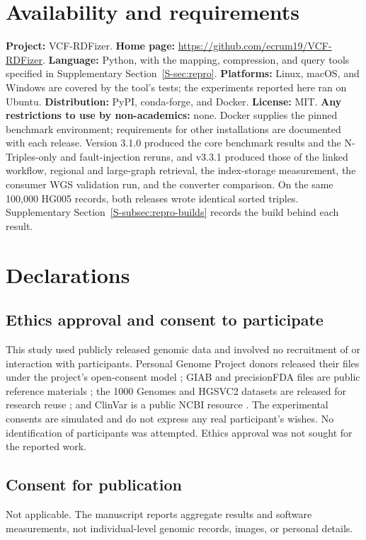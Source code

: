\documentclass[pdflatex,sn-mathphys-num]{sn-jnl}
\begin{document}
\section*{Availability and requirements}
\textbf{Project:} VCF-RDFizer.
\textbf{Home page:} \url{https://github.com/ecrum19/VCF-RDFizer}.
\textbf{Language:} Python, with the mapping, compression, and query tools specified in Supplementary Section~\ref{S-sec:repro}.
\textbf{Platforms:} Linux, macOS, and Windows are covered by the tool's tests; the experiments reported here ran on Ubuntu.
\textbf{Distribution:} PyPI, conda-forge, and Docker.
\textbf{License:} MIT.
\textbf{Any restrictions to use by non-academics:} none.
Docker supplies the pinned benchmark environment; requirements for other installations are documented with each release.
Version 3.1.0 produced the core benchmark results and the N-Triples-only and fault-injection reruns, and v3.3.1 produced those of the linked workflow, regional and large-graph retrieval, the index-storage measurement, the consumer WGS validation run, and the converter comparison.
On the same 100,000 HG005 records, both releases wrote identical sorted triples.
Supplementary Section~\ref{S-subsec:repro-builds} records the build behind each result.

\section*{Declarations}
\subsection*{Ethics approval and consent to participate}
This study used publicly released genomic data and involved no recruitment of or interaction with participants.
Personal Genome Project donors released their files under the project's open-consent model \cite{personal_genome_proj}; GIAB and precisionFDA files are public reference materials \cite{nist_gib_2025,giab_v421_2022}; the 1000 Genomes and HGSVC2 datasets are released for research reuse \cite{thousand_genomes_2015,byrska2022highcoverage,hgsvc_2021}; and ClinVar is a public NCBI resource \cite{clinvar_vcf}.
The experimental consents are simulated and do not express any real participant's wishes.
No identification of participants was attempted.
Ethics approval was not sought for the reported work.

\subsection*{Consent for publication}
Not applicable.
The manuscript reports aggregate results and software measurements, not individual-level genomic records, images, or personal details.
\end{document}
